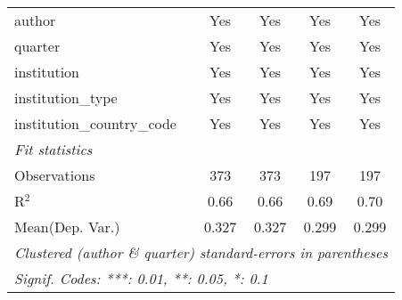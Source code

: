 \begin{tabular}{lcccc}
   author                                   & Yes     & Yes            & Yes     & Yes\\  
   quarter                                  & Yes     & Yes            & Yes     & Yes\\  
   institution                              & Yes     & Yes            & Yes     & Yes\\  
   institution\_type                        & Yes     & Yes            & Yes     & Yes\\  
   institution\_country\_code               & Yes     & Yes            & Yes     & Yes\\  
   \midrule
   \emph{Fit statistics}\\
   Observations                             & 373     & 373            & 197     & 197\\  
   R$^2$                                    & 0.66    & 0.66           & 0.69    & 0.70\\  
Mean(Dep. Var.) & 0.327 & 0.327 & 0.299 & 0.299 \\
   \midrule \midrule
   \multicolumn{5}{l}{\emph{Clustered (author \& quarter) standard-errors in parentheses}}\\
   \multicolumn{5}{l}{\emph{Signif. Codes: ***: 0.01, **: 0.05, *: 0.1}}\\
\end{tabular}
\par\endgroup
